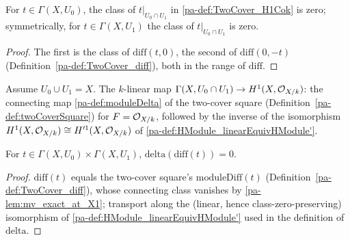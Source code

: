 \begin{lemma}
  \label{pa-lem:TwoCover_h1Cok_mk_res}
  \leanok

  For \(t \in \Gamma(X,U_0)\), the class of \(t|_{U_0 \cap U_1}\) in
  \ref{pa-def:TwoCover_H1Cok} is zero; symmetrically, for \(t \in \Gamma(X,U_1)\) the class of
  \(t|_{U_0 \cap U_1}\) is zero.
\end{lemma}
\begin{proof}
  \leanok
  The first is the class of \(\mathrm{diff}(t,0)\), the second of \(\mathrm{diff}(0,-t)\)
  (Definition~\ref{pa-def:TwoCover_diff}), both in the range of \(\mathrm{diff}\).
\end{proof}

\begin{definition}
  \label{pa-def:TwoCover_delta}
  \leanok

  Assume \(U_0 \cup U_1 = X\). The \(k\)-linear map
  \(\Gamma(X, U_0 \cap U_1) \to H^1(X, \mathcal{O}_{X/k})\): the connecting map
  \ref{pa-def:moduleDelta} of the two-cover square (Definition~\ref{pa-def:twoCoverSquare}) for
  \(F = \mathcal{O}_{X/k}\), followed by the inverse of the isomorphism
  \(H^1(X,\mathcal{O}_{X/k}) \cong H'^1(X,\mathcal{O}_{X/k})\) of
  \ref{pa-def:HModule_linearEquivHModule'}.
\end{definition}

\begin{lemma}
  \label{pa-lem:TwoCover_delta_diff}
  \leanok

  For \(t \in \Gamma(X,U_0) \times \Gamma(X,U_1)\), \(\mathrm{delta}(\mathrm{diff}(t)) = 0\).
\end{lemma}
\begin{proof}
  \leanok
  \(\mathrm{diff}(t)\) equals the two-cover square's \(\mathrm{moduleDiff}(t)\)
  (Definition~\ref{pa-def:TwoCover_diff}), whose connecting class vanishes by
  \ref{pa-lem:mv_exact_at_X1}; transport along the (linear, hence class-zero-preserving)
  isomorphism of \ref{pa-def:HModule_linearEquivHModule'} used in the definition of
  \(\mathrm{delta}\).
\end{proof}

